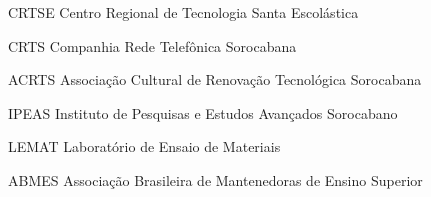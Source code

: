\begin{siglas}
  \item[CRTSE] Centro Regional de Tecnologia Santa Escolástica
  \item[CRTS] Companhia Rede Telefônica Sorocabana
  \item[ACRTS] Associação Cultural de Renovação Tecnológica Sorocabana
  \item[IPEAS] Instituto de Pesquisas e Estudos Avançados Sorocabano
  \item[LEMAT] Laboratório de Ensaio de Materiais
  \item[ABMES] Associação Brasileira de Mantenedoras de Ensino Superior
\end{siglas}